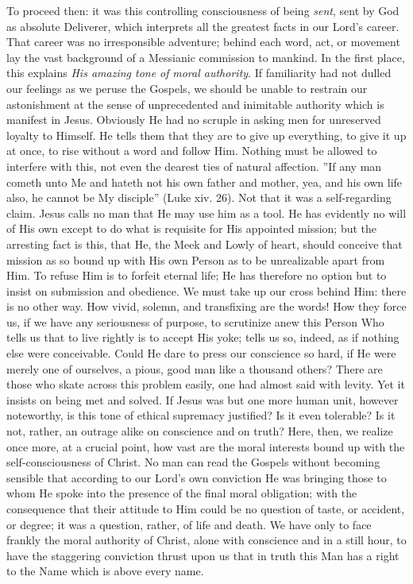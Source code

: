 \documentclass[12pt,a5paper,oneside]{book}
\begin{document}
To proceed then: it was this controlling
consciousness of being \textit{sent}, sent by God as
absolute Deliverer, which interprets all the
greatest facts in our Lord's career. That career
was no irresponsible adventure; behind each
word, act, or movement lay the vast background
of a Messianic commission to mankind. In the
first place, this explains \textit{His amazing tone of}
\textit{moral authority}. If familiarity had not dulled
our feelings as we peruse the Gospels, we should
be unable to restrain our astonishment at the
sense of unprecedented and inimitable authority
which is manifest in Jesus. Obviously He
had no scruple in asking men for unreserved
loyalty to Himself. He tells them that they
are to give up everything, to give it up at once,
to rise without a word and follow Him. Nothing
must be allowed to interfere with this, not
even the dearest ties of natural affection.
''If any man cometh unto Me and hateth not
his own father and mother, yea, and his own
life also, he cannot be My disciple'' (Luke xiv.
26). Not that it was a self-regarding claim.
Jesus calls no man that He may use him as a
tool. He has evidently no will of His own
except to do what is requisite for His appointed
mission; but the arresting fact is this, that He,
the Meek and Lowly of heart, should conceive
that mission as so bound up with His own
Person as to be unrealizable apart from Him.
To refuse Him is to forfeit eternal life; He has
therefore no option but to insist on submission
and obedience. We must take up our cross
behind Him: there is no other way. How
vivid, solemn, and transfixing are the words!
How they force us, if we have any seriousness
of purpose, to scrutinize anew this Person
Who tells us that to live rightly is to accept
His yoke; tells us so, indeed, as if nothing
else were conceivable. Could He dare to press
our conscience so hard, if He were merely
one of ourselves, a pious, good man like a
thousand others? There are those who skate
across this problem easily, one had almost
said with levity. Yet it insists on being met
and solved. If Jesus was but one more human
unit, however noteworthy, is this tone of
ethical supremacy justified? Is it even tolerable? 
Is it not, rather, an outrage alike on
conscience and on truth? Here, then, we
realize once more, at a crucial point, how vast
are the moral interests bound up with the self-consciousness
of Christ. No man can read the
Gospels without becoming sensible that according 
to our Lord's own conviction He was
bringing those to whom He spoke into the
presence of the final moral obligation; with
the consequence that their attitude to Him
could be no question of taste, or accident, or
degree; it was a question, rather, of life and
death. We have only to face frankly the moral
authority of Christ, alone with conscience and
in a still hour, to have the staggering conviction
thrust upon us that in truth this Man has a right
to the Name which is above every name.
\end{document}
